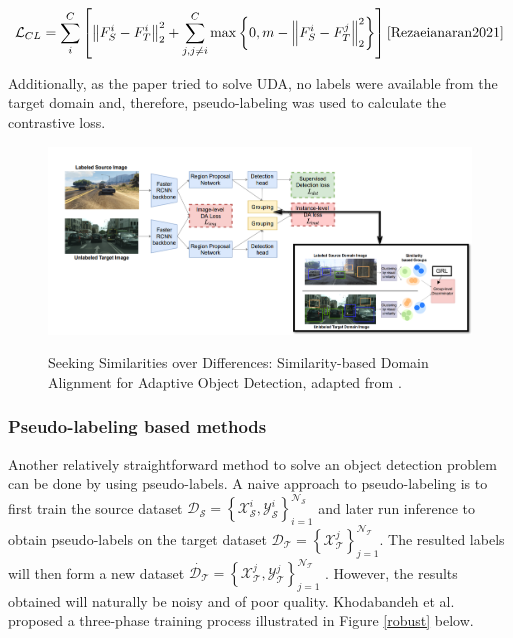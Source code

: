 \documentclass[english, 12pt, a4paper, elec, utf8, a-1b, online]{aaltothesis}
\begin{document}
\begin{equation}
\mathcal{L}_{C L}=\sum_{i}^{C}\left[\left\|F_{S}^{i}-F_{T}^{i}\right\|_{2}^{2}+\sum_{j, j \neq i}^{C} \max \left\{0, m-\left\|F_{S}^{i}-F_{T}^{j}\right\|_{2}^{2}\right\}\right]
\label{contrastiveL} 
\cite{Rezaeianaran2021} 
\end{equation}

Additionally, as the paper tried to solve UDA, no labels were available from the target domain and, therefore, pseudo-labeling was used to calculate the contrastive loss.  


\begin{figure}[htb]
	\begin{center}
		\includegraphics[width=16cm]{./VisGa.png}
	\end{center}
	\caption{Seeking Similarities over Differences: Similarity-based Domain Alignment for Adaptive Object Detection, adapted from \cite{Rezaeianaran2021}.}
	\begin{center}
		\label{visga}
	\end{center}
\end{figure}
\FloatBarrier


\subsubsection{Pseudo-labeling based methods}

Another relatively straightforward method to solve an object detection problem can be done by using pseudo-labels. A naive approach to pseudo-labeling is to first train the source dataset $\mathcal{D}_{\mathcal{S}}=\left\{\mathcal{X}_{\mathcal{S}}^{i}, \mathcal{Y}_{\mathcal{S}}^{i}\right\}_{i=1}^{\mathcal{N}_{\mathcal{S}}}$ and later run inference to obtain pseudo-labels on the target dataset $\mathcal{D}_{\mathcal{T}}=\left\{\mathcal{X}_{\mathcal{T}}^{j}\right\}_{j=1}^{\mathcal{N}_{\mathcal{T}}}$. The resulted labels will then form a new dataset $\dot{\mathcal{D}_{\mathcal{T}}}=\left\{\mathcal{X}_{\mathcal{T}}^{j}, \mathcal{Y}_{\mathcal{T}}^{j}\right\}_{j=1}^{\mathcal{N}_{\mathcal{T}}}$ \cite{Oza2021}. However, the results obtained will naturally be noisy and of poor quality. Khodabandeh et al. proposed a three-phase training process illustrated in Figure \ref{robust} below. 
\end{document}
